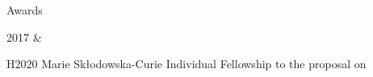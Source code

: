 \documentclass[a4paper,9pt]{article}
\newcommand{\dynhref}[2]{%
  \iftoggle{expliciturl}{%
    #2 \footnote{\href{http://#1}{\detokenize{#1}}}%
  }{%
    \href{http://#1}{#2}%
  }%
}
\begin{document}



\begin{cvsection}{Awards}

2017 &
  \begin{itti}
    \item H2020 Marie Sk\l{}odowska-Curie Individual Fellowship \dynhref{ec.europa.eu/research/soe/index.cfm?pg=what}{Seal of Excellent} to the proposal on \dynhref{jgte.github.io/permalinks/H2020_MSCA_IF_2017_Seal_of_Excellence-jgte.pdf}{\emph{Direct Gravimetric data assimilation into Geophysical models}}
  \end{itti}

\end{cvsection}

\end{document}
